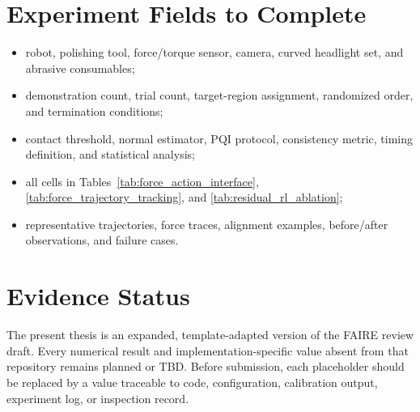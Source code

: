 \section{Experiment Fields to Complete}
\begin{itemize}
  \item robot, polishing tool, force/torque sensor, camera, curved headlight set, and abrasive consumables;
  \item demonstration count, trial count, target-region assignment, randomized order, and termination conditions;
  \item contact threshold, normal estimator, PQI protocol, consistency metric, timing definition, and statistical analysis;
  \item all cells in Tables~\ref{tab:force_action_interface}, \ref{tab:force_trajectory_tracking}, and \ref{tab:residual_rl_ablation};
  \item representative trajectories, force traces, alignment examples, before/after observations, and failure cases.
\end{itemize}

\section{Evidence Status}
The present thesis is an expanded, template-adapted version of the FAIRE review draft. Every numerical result and implementation-specific value absent from that repository remains planned or TBD. Before submission, each placeholder should be replaced by a value traceable to code, configuration, calibration output, experiment log, or inspection record.
